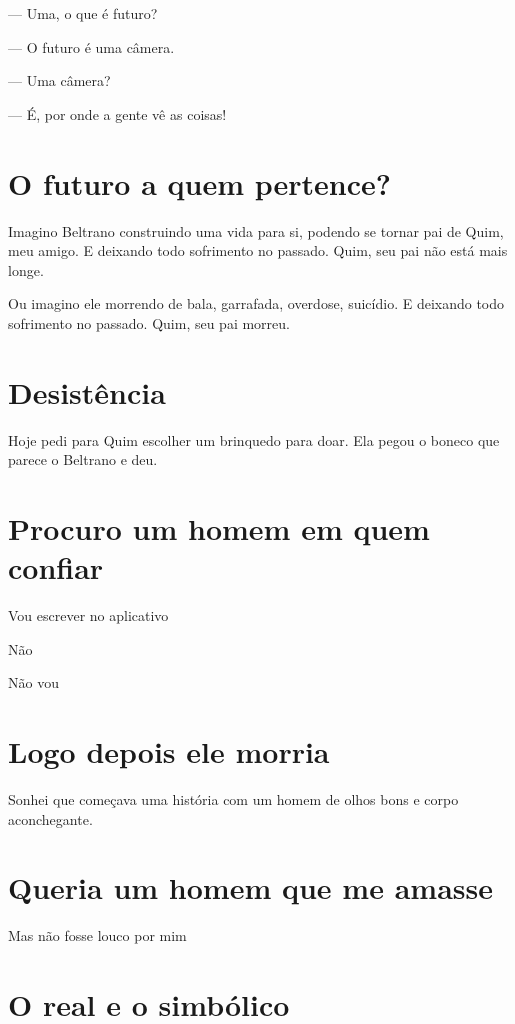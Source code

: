 {{--- Uma, o que é futuro?

--- O futuro é uma câmera.

--- Uma câmera?

--- É, por onde a gente vê as coisas!
}

\chapter{O futuro a quem pertence?}\label{o-futuro-a-quem-pertence}


Imagino Beltrano construindo uma vida para si, podendo se tornar pai de
Quim, meu amigo. E deixando todo sofrimento no passado. Quim, seu pai
não está mais longe.

Ou imagino ele morrendo de bala, garrafada, overdose, suicídio. E
deixando todo sofrimento no passado. Quim, seu pai morreu.

\chapter{Desistência}\label{desistuxeancia}

Hoje pedi para Quim escolher um brinquedo para doar. Ela pegou o boneco
que parece o Beltrano e deu.

{\parindent0pt\parskip1pt\raggedright

\chapter{Procuro um homem em quem
confiar}\label{procuro-um-homem-em-quem-confiar}

Vou escrever no aplicativo

Não

Não vou

\chapter{Logo depois ele morria}\label{logo-depois-ele-morria}

Sonhei que começava uma história com um homem de olhos bons e corpo
aconchegante.

\chapter{Queria um homem que me
amasse}\label{queria-um-homem-que-me-amasse}

Mas não fosse louco por mim


\chapter{O real e o simbólico}

}}
